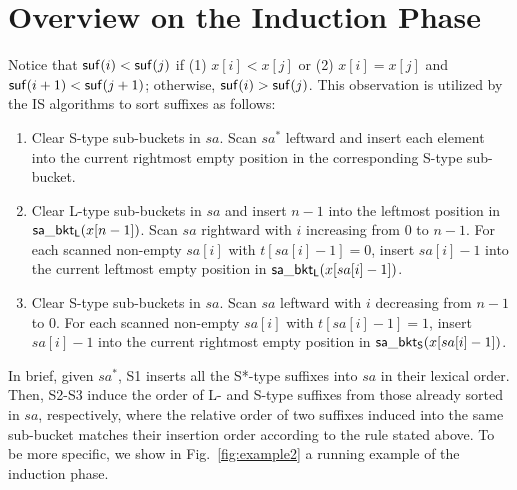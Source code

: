 \documentclass[10pt,journal,compsoc]{IEEEtran}
\begin{document}
\clearpage
\appendices
\section{Overview on the Induction Phase} \label{sec:appendix}

Notice that ${\sf suf}(i) < {\sf suf}(j)$ if (1) $x[i] < x[j]$ or (2) $x[i] = x[j]$ and ${\sf suf}(i + 1) < {\sf suf}(j + 1)$; otherwise, ${\sf suf}(i) > {\sf suf}(j)$. This observation is utilized by the IS algorithms to sort suffixes as follows:

\begin{enumerate}[S1]
	\item 
	Clear S-type sub-buckets in $sa$. Scan $sa^*$ leftward and insert each element into the current rightmost empty position in the corresponding S-type sub-bucket.
	
	\item 
	Clear L-type sub-buckets in $sa$ and insert $n - 1$ into the leftmost position in ${\sf sa\_bkt_L}(x[n - 1])$. Scan $sa$ rightward with $i$ increasing from $0$ to $n - 1$. For each scanned non-empty $sa[i]$ with $t[sa[i] - 1] = 0$, insert $sa[i] - 1$ into the current leftmost empty position in ${\sf sa\_bkt_L}(x[sa[i] - 1])$.
	
	\item
	Clear S-type sub-buckets in $sa$. Scan $sa$ leftward with $i$ decreasing from $n - 1$ to $0$. For each scanned non-empty $sa[i]$ with $t[sa[i] - 1] = 1$, insert $sa[i] - 1$ into the current rightmost empty position in ${\sf sa\_bkt_S}(x[sa[i] - 1])$.
	
\end{enumerate}

In brief, given $sa^*$, S1 inserts all the S*-type suffixes into $sa$ in their lexical order. Then, S2-S3 induce the order of L- and S-type suffixes from those already sorted in $sa$, respectively, where the relative order of two suffixes induced into the same sub-bucket matches their insertion order according to the rule stated above. To be more specific, we show in Fig.~\ref{fig:example2} a running example of the induction phase.
\end{document}
